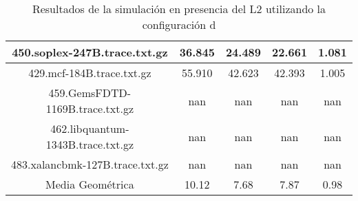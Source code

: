 \begin{table}[H]
\begin{tabular}{|c|c|c|c|c|}
450.soplex-247B.trace.txt.gz & 36.845 & 24.489 &  22.661 & 1.081\\\hline
429.mcf-184B.trace.txt.gz & 55.910 & 42.623 &  42.393 & 1.005\\\hline
459.GemsFDTD-1169B.trace.txt.gz & nan & nan &  nan & nan\\\hline
462.libquantum-1343B.trace.txt.gz & nan & nan &  nan & nan\\\hline
483.xalancbmk-127B.trace.txt.gz & nan & nan &  nan & nan\\\hline
Media Geométrica & 10.12 & 7.68& 7.87 & 0.98\\\hline
\end{tabular}
\caption{Resultados de la simulación en presencia del L2 utilizando la configuración d}
\label{tab:amatL3d}
\end{table}